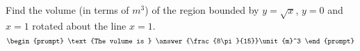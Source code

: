 \documentclass{ximera}
\author{Gregory Hartman \and Matthew Carr}
\begin{document}
\begin{exercise}






Find the volume (in terms of $\unit{m}^3$) of the region bounded by $y=\sqrt{x}$, $y=0$ and $x=1$ rotated about the line $x=1$.
\[
\begin{prompt}
\text{The volume is } \answer{\frac{8\pi}{15}}\unit{m}^3
\end{prompt}
\]




\end{exercise}
\end{document}
